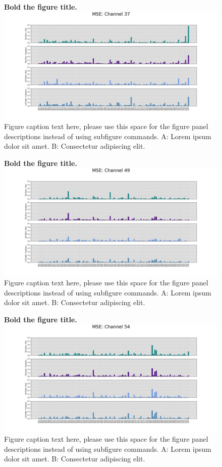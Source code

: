 \documentclass[10pt,letterpaper]{article}
\begin{document}
\begin{figure}[!h]
  \caption{{\bf Bold the figure title.}
  \includegraphics[width=.9\textwidth]{../output/figs/mse/mse37.jpg}
  Figure caption text here, please use this space for the figure panel descriptions instead of using subfigure commands. A: Lorem ipsum dolor sit amet. B: Consectetur adipiscing elit.}
  \label{fig:mse37}
\end{figure}


\begin{figure}[!h]
  \caption{{\bf Bold the figure title.}
  \includegraphics[width=.9\textwidth]{../output/figs/mse/mse49.jpg}
  Figure caption text here, please use this space for the figure panel descriptions instead of using subfigure commands. A: Lorem ipsum dolor sit amet. B: Consectetur adipiscing elit.}
  \label{fig:mse49}
\end{figure}


\begin{figure}[!h]
  \caption{{\bf Bold the figure title.}
  \includegraphics[width=.9\textwidth]{../output/figs/mse/mse54.jpg}
  Figure caption text here, please use this space for the figure panel descriptions instead of using subfigure commands. A: Lorem ipsum dolor sit amet. B: Consectetur adipiscing elit.}
  \label{fig:mse54}
\end{figure}
\end{document}
